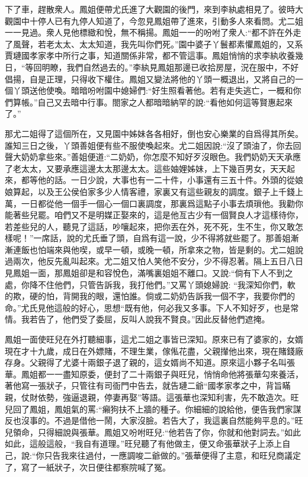 \begin{parag}
    下了車，趕散衆人。鳳姐便帶尤氏進了大觀園的後門，來到李紈處相見了。彼時大觀園中十停人已有九停人知道了，今忽見鳳姐帶了進來，引動多人來看問。尤二姐一一見過。衆人見他標緻和悅，無不稱揚。鳳姐一一的吩咐了衆人:“都不許在外走了風聲，若老太太、太太知道，我先叫你們死。”園中婆子丫鬟都素懼鳳姐的，又系賈璉國孝家孝中所行之事，知道關係非常，都不管這事。鳳姐悄悄的求李紈收養幾日，“等回明瞭，我們自然過去的。”李紈見鳳姐那邊已收拾房屋，況在服中，不好倡揚，自是正理，只得收下權住。鳳姐又變法將他的丫頭一概退出，又將自己的一個丫頭送他使喚。暗暗吩咐園中媳婦們:“好生照看著他。若有走失逃亡，一概和你們算帳。”自己又去暗中行事。閤家之人都暗暗納罕的說:“看他如何這等賢惠起來了。”
\end{parag}


\begin{parag}
    那尤二姐得了這個所在，又見園中姊妹各各相好，倒也安心樂業的自爲得其所矣。誰知三日之後，丫頭善姐便有些不服使喚起來。尤二姐因說:“沒了頭油了，你去回聲大奶奶拿些來。”善姐便道:“二奶奶，你怎麼不知好歹沒眼色。我們奶奶天天承應了老太太，又要承應這邊太太那邊太太。這些妯娌姊妹，上下幾百男女，天天起來，都等他的話。一日少說，大事也有一二十件，小事還有三五十件。外頭的從娘娘算起，以及王公侯伯家多少人情客禮，家裏又有這些親友的調度。銀子上千錢上萬，一日都從他一個手一個心一個口裏調度，那裏爲這點子小事去煩瑣他。我勸你能著些兒罷。咱們又不是明媒正娶來的，這是他亙古少有一個賢良人才這樣待你，若差些兒的人，聽見了這話，吵嚷起來，把你丟在外，死不死，生不生，你又敢怎樣呢！”一席話，說的尤氏垂了頭，自爲有這一說，少不得將就些罷了。那善姐漸漸連飯也怕端來與他喫，或早一頓，或晚一頓，所拿來之物，皆是剩的。尤二姐說過兩次，他反先亂叫起來。尤二姐又怕人笑他不安分，少不得忍著。隔上五日八日見鳳姐一面，那鳳姐卻是和容悅色，滿嘴裏姐姐不離口。又說:“倘有下人不到之處，你降不住他們，只管告訴我，我打他們。”又罵丫頭媳婦說: “我深知你們，軟的欺，硬的怕，背開我的眼，還怕誰。倘或二奶奶告訴我一個不字，我要你們的命。”尤氏見他這般的好心，思想“既有他，何必我又多事。下人不知好歹，也是常情。我若告了，他們受了委屈，反叫人說我不賢良。”因此反替他們遮掩。
\end{parag}


\begin{parag}
    鳳姐一面使旺兒在外打聽細事，這尤二姐之事皆已深知。原來已有了婆家的，女婿現在才十九歲，成日在外嫖賭，不理生業，傢俬花盡，父親攆他出來，現在賭錢廠存身。父親得了尤婆十兩銀子退了親的，這女婿尚不知道。原來這小夥子名叫張華。鳳姐都一一盡知原委，便封了二十兩銀子與旺兒，悄悄命他將張華勾來養活，著他寫一張狀子，只管往有司衙門中告去，就告璉二爺“國孝家孝之中，背旨瞞親，仗財依勢，強逼退親，停妻再娶”等語。這張華也深知利害，先不敢造次。旺兒回了鳳姐，鳳姐氣的罵:“癩狗扶不上牆的種子。你細細的說給他，便告我們家謀反也沒事的。不過是借他一鬧，大家沒臉。若告大了，我這裏自然能夠平息的。”旺兒領命，只得細說與張華。鳳姐又吩咐旺兒:“他若告了你，你就和他對詞去。”如此如此，這般這般，“我自有道理。”旺兒聽了有他做主，便又命張華狀子上添上自己，說:“你只告我來往過付，一應調唆二爺做的。”張華便得了主意，和旺兒商議定了，寫了一紙狀子，次日便往都察院喊了冤。
\end{parag}


